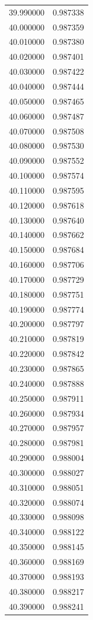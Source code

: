 \begin{tabular}{rr}
39.990000 & 0.987338 \\
40.000000 & 0.987359 \\
40.010000 & 0.987380 \\
40.020000 & 0.987401 \\
40.030000 & 0.987422 \\
40.040000 & 0.987444 \\
40.050000 & 0.987465 \\
40.060000 & 0.987487 \\
40.070000 & 0.987508 \\
40.080000 & 0.987530 \\
40.090000 & 0.987552 \\
40.100000 & 0.987574 \\
40.110000 & 0.987595 \\
40.120000 & 0.987618 \\
40.130000 & 0.987640 \\
40.140000 & 0.987662 \\
40.150000 & 0.987684 \\
40.160000 & 0.987706 \\
40.170000 & 0.987729 \\
40.180000 & 0.987751 \\
40.190000 & 0.987774 \\
40.200000 & 0.987797 \\
40.210000 & 0.987819 \\
40.220000 & 0.987842 \\
40.230000 & 0.987865 \\
40.240000 & 0.987888 \\
40.250000 & 0.987911 \\
40.260000 & 0.987934 \\
40.270000 & 0.987957 \\
40.280000 & 0.987981 \\
40.290000 & 0.988004 \\
40.300000 & 0.988027 \\
40.310000 & 0.988051 \\
40.320000 & 0.988074 \\
40.330000 & 0.988098 \\
40.340000 & 0.988122 \\
40.350000 & 0.988145 \\
40.360000 & 0.988169 \\
40.370000 & 0.988193 \\
40.380000 & 0.988217 \\
40.390000 & 0.988241 \\

\end{tabular}
